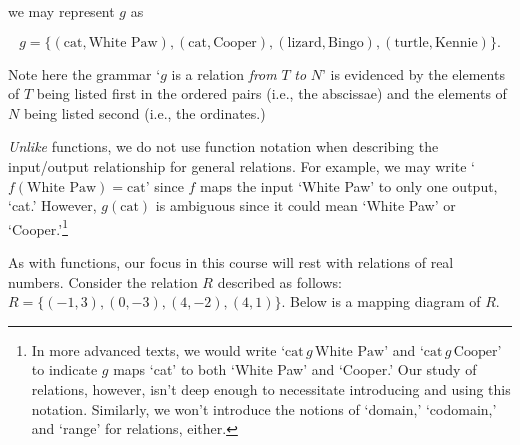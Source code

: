 \documentclass{ximera}
\begin{document}
we may represent $g$ as 

\[ g = \{ (\text{cat}, \text{White Paw}), (\text{cat}, \text{Cooper}), ( \text{lizard}, \text{Bingo}), (\text{turtle}, \text{Kennie}) \}. \]

Note here  the grammar `$g$ is a relation \textit{from} $T$ \textit{to} $N$' is evidenced by the elements of $T$ being listed first in the ordered pairs (i.e., the abscissae) and the elements of $N$ being listed second (i.e., the ordinates.)

\textit{Unlike} functions, we do not use function notation when describing the input/output relationship for general relations.  For example, we may write `$f(\text{White Paw}) = \text{cat}$'  since $f$ maps the input `White Paw' to only one output, `cat.'  However, $g(\text{cat})$ is ambiguous since it could mean `White Paw' or `Cooper.'\footnote{In more advanced texts, we would write `$\text{cat} \, g \, \text{White Paw}$' and `$\text{cat} \,  g \, \text{Cooper}$' to indicate $g$ maps `cat' to both `White Paw' and `Cooper.'  Our study of relations, however, isn't deep enough to necessitate introducing and using this notation.  Similarly, we won't introduce the notions of `domain,' `codomain,' and `range' for relations, either.}

As with functions, our focus in this course will rest with relations of real numbers.  Consider the relation $R$ described as follows:  $R = \{ (-1,3), (0,-3), (4,-2), (4,1) \}$.  Below is a mapping diagram of $R$.  

\begin{image}

\end{image}
\begin{center}
\end{center}
\end{document}
